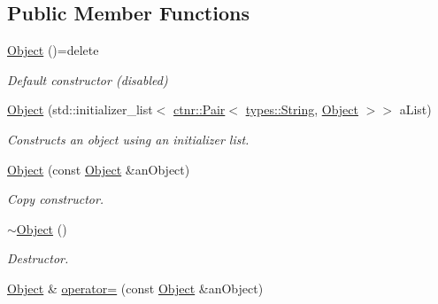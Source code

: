 \subsection*{Public Member Functions}
\begin{DoxyCompactItemize}
\item 
\mbox{\label{classlibrary_1_1core_1_1ctnr_1_1_object_a51bb72dec3a1b2738e0ad92b977b8d8d}} 
\hyperlink{classlibrary_1_1core_1_1ctnr_1_1_object_a51bb72dec3a1b2738e0ad92b977b8d8d}{Object} ()=delete
\begin{DoxyCompactList}\small\item\em Default constructor (disabled) \end{DoxyCompactList}\item 
\hyperlink{classlibrary_1_1core_1_1ctnr_1_1_object_a351131c4c1d6d7bd4f488ba99d7bf2d5}{Object} (std\+::initializer\+\_\+list$<$ \hyperlink{_pair_8hpp_aad6f8de4c0f279c10436d59d4ace74bd}{ctnr\+::\+Pair}$<$ \hyperlink{classlibrary_1_1core_1_1types_1_1_string}{types\+::\+String}, \hyperlink{classlibrary_1_1core_1_1ctnr_1_1_object}{Object} $>$$>$ a\+List)
\begin{DoxyCompactList}\small\item\em Constructs an object using an initializer list. \end{DoxyCompactList}\item 
\hyperlink{classlibrary_1_1core_1_1ctnr_1_1_object_a90f9c4579306498a5da413ac89ac0109}{Object} (const \hyperlink{classlibrary_1_1core_1_1ctnr_1_1_object}{Object} \&an\+Object)
\begin{DoxyCompactList}\small\item\em Copy constructor. \end{DoxyCompactList}\item 
\mbox{\label{classlibrary_1_1core_1_1ctnr_1_1_object_a18a5350937267e55df0a76f5ce154a7a}} 
\hyperlink{classlibrary_1_1core_1_1ctnr_1_1_object_a18a5350937267e55df0a76f5ce154a7a}{$\sim$\+Object} ()
\begin{DoxyCompactList}\small\item\em Destructor. \end{DoxyCompactList}\item 
\hyperlink{classlibrary_1_1core_1_1ctnr_1_1_object}{Object} \& \hyperlink{classlibrary_1_1core_1_1ctnr_1_1_object_acbc5a6b4e2971d1cb977867d086832fe}{operator=} (const \hyperlink{classlibrary_1_1core_1_1ctnr_1_1_object}{Object} \&an\+Object)
$$
\end{DoxyCompactItemize}
